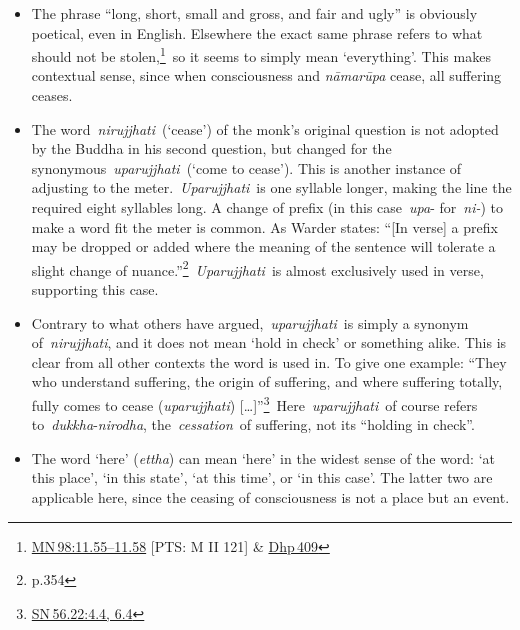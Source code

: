 \documentclass[10pt, openright]{book}
\begin{document}
\begin{itemize}

\itemsep5pt\parskip0pt


\item
The phrase “long, short, small and gross, and fair and ugly” is obviously poetical, even in English. Elsewhere the exact same phrase refers to what should not be stolen,\footnote {\href{https://suttacentral.net/mn98/en/sujato\#11.55}{MN 98:11.55–11.58} [PTS: M II 121] \& \href{https://suttacentral.net/dhp409/en/sujato}{Dhp 409}} so it seems to simply mean ‘everything’. This makes contextual sense, since when consciousness and \textit{nāmarūpa} cease, all suffering ceases.



\item
The word \textit{nirujjhati} (‘cease’) of the monk’s original question is not adopted by the Buddha in his second question, but changed for the synonymous \textit{uparujjhati} (‘come to cease’). This is another instance of adjusting to the meter. \textit{Uparujjhati} is one syllable longer, making the line the required eight syllables long. A change of prefix (in this case \textit{upa}- for \textit{ni-}) to make a word fit the meter is common. As Warder states: “[In verse] a prefix may be dropped or added where the meaning of the sentence will tolerate a slight change of nuance.”\footnote {\cite{Warder} p.354} \textit{Uparujjhati} is almost exclusively used in verse, supporting this case.



\item
Contrary to what others have argued, \textit{uparujjhati} is simply a synonym of \textit{nirujjhati}, and it does not mean ‘hold in check’ or something alike. This is clear from all other contexts the word is used in. To give one example: “They who understand suffering, the origin of suffering, and where suffering totally, fully comes to cease (\textit{uparujjhati}) […]”\footnote {\href{https://suttacentral.net/sn56.22/en/sujato\#4.4}{SN 56.22:4.4, 6.4}} Here \textit{uparujjhati} of course refers to \textit{dukkha}-\textit{nirodha}, the \textit{cessation} of suffering, not its “holding in check”.



\item
The word ‘here’ (\textit{ettha}) can mean ‘here’ in the widest sense of the word: ‘at this place’, ‘in this state’, ‘at this time’, or ‘in this case’. The latter two are applicable here, since the ceasing of consciousness is not a place but an event.





\end{itemize}
\end{document}
